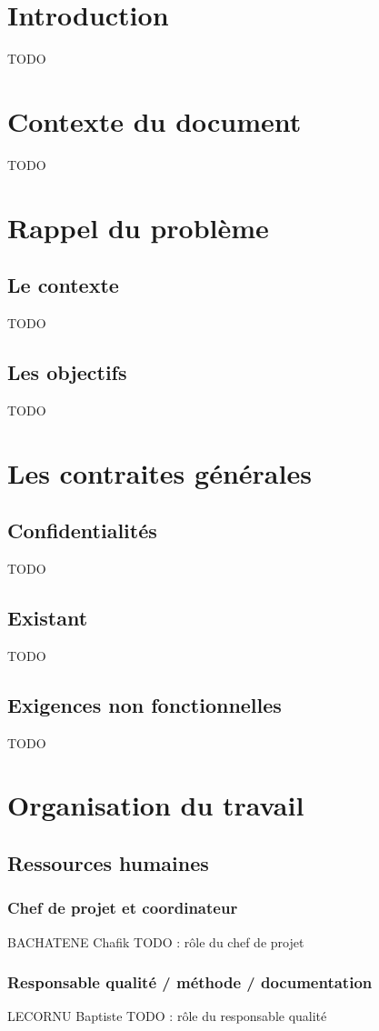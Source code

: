 \section{Introduction}
TODO
\section{Contexte du document}
TODO
\section{Rappel du problème}
\subsection{Le contexte}
TODO
\subsection{Les objectifs}
TODO
\section{Les contraites générales}
\subsection{Confidentialités}
TODO
\subsection{Existant}
TODO
\subsection{Exigences non fonctionnelles}
TODO
\section{Organisation du travail}
\subsection{Ressources humaines}
\subsubsection{Chef de projet et coordinateur}
BACHATENE Chafik
TODO : rôle du chef de projet
\subsubsection{Responsable qualité / méthode / documentation}
LECORNU Baptiste
TODO : rôle du responsable qualité
